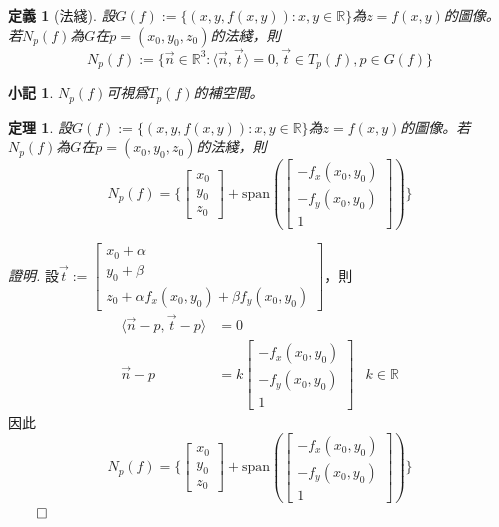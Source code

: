 \documentclass[12pt]{article}
\newcommand{\innerprod}[2]{\langle{#1},{#2}\rangle}
\newtheorem{definition}{定義}
\newtheorem*{theorem}{定理}
\newtheorem*{remark}{小記}
\renewenvironment*{proof}{\textit{證明.}}{\hfill$\qed$}
\begin{document}
    \begin{definition}[法綫]
        設$G(f):=\{(x,y,f(x,y)):x,y\in\mathbb{R}\}$為$z=f(x,y)$的圖像。若$N_p(f)$為$G$在$p=(x_0,y_0,z_0)$的法綫，則$$N_p(f):=\{\vec{n}\in\mathbb{R}^3:\innerprod{\vec{n}}{\vec{t}}=0, \vec{t}\in T_p(f), p\in G(f)\}$$
    \end{definition}

    \begin{remark}
        $N_p(f)$可視爲$T_p(f)$的補空間。
    \end{remark}

    \begin{theorem}
        設$G(f):=\{(x,y,f(x,y)):x,y\in\mathbb{R}\}$為$z=f(x,y)$的圖像。若$N_p(f)$為$G$在$p=(x_0,y_0,z_0)$的法綫，則$$N_p(f)=\{\begin{bmatrix}
            x_0\\y_0\\z_0
        \end{bmatrix}+\mathrm{span}(\begin{bmatrix}
            -f_x(x_0,y_0)\\
            -f_y(x_0,y_0)\\
            1
        \end{bmatrix})\}$$
    \end{theorem}
    
    \begin{proof}
        設$\vec{t}:=\begin{bmatrix}
            x_0+\alpha\\y_0+\beta\\z_0+\alpha f_x(x_0,y_0)+\beta f_y(x_0,y_0)
        \end{bmatrix}$，則\begin{align*}
            \innerprod{\vec{n}-p}{\vec{t}-p}&=0\\
            \vec{n}-p&=k\begin{bmatrix}
                -f_x(x_0,y_0)\\
                -f_y(x_0,y_0)\\
                1
            \end{bmatrix}&k\in\mathbb{R}
        \end{align*}
        因此$$N_p(f)=\{\begin{bmatrix}
            x_0\\y_0\\z_0
        \end{bmatrix}+\mathrm{span}(\begin{bmatrix}
            -f_x(x_0,y_0)\\
            -f_y(x_0,y_0)\\
            1
        \end{bmatrix})\}$$
    \end{proof}
\end{document}
